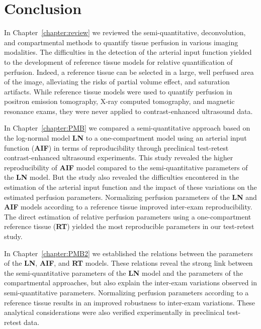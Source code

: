 \chapter{Conclusion}\label{chapter:conclusion}
In Chapter~\ref{chapter:review} we reviewed the semi-quantitative, deconvolution, and compartmental methods to quantify tissue perfusion in various imaging modalities.
The difficulties in the detection of the arterial input function yielded to the development of reference tissue models for relative quantification of perfusion.
Indeed, a reference tissue can be selected in a large, well perfused area of the image, alleviating the risks of partial volume effect, and saturation artifacts.
While reference tissue models were used to quantify perfusion in positron emission tomography, X-ray computed tomography, and magnetic resonance exams, they were never applied to contrast-enhanced ultrasound data.

In Chapter~\ref{chapter:PMB} we compared a semi-quantitative approach based on the log-normal model \textbf{LN} to a one-compartment model using an arterial input function (\textbf{AIF}) in terms of reproducibility through preclinical test-retest contrast-enhanced ultrasound experiments.
This study revealed the higher reproducibility of \textbf{AIF} model compared to the semi-quantitative parameters of the \textbf{LN} model.
But the study also revealed the difficulties encontered in the estimation of the arterial input function and the impact of these variations on the estimated perfusion parameters.
Normalizing perfusion parameters of the \textbf{LN} and \textbf{AIF} models according to a reference tissue improved inter-exam reproducibility.
The direct estimation of relative perfusion parameters using a one-compartment reference tissue (\textbf{RT}) yielded the most reproducible parameters in our test-retest study.

In Chapter~\ref{chapter:PMB2} we established the relations between the parameters of the \textbf{LN}, \textbf{AIF}, and \textbf{RT} models.
These relations reveal the strong link between the semi-quantitative parameters of the \textbf{LN} model and the parameters of the compartmental approaches, but also explain the inter-exam variations observed in semi-quantitative parameters.
Normalizing perfusion parameters according to a reference tissue results in an improved robustness to inter-exam variations.
These analytical considerations were also verified experimentally in preclinical test-retest data.

